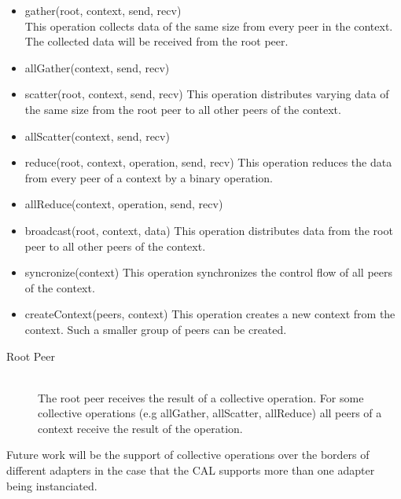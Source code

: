 \begin{itemize}
\item gather(root, context, send, recv)\\
  This operation collects data of the same size from
  every peer in the context. The collected data will be
  received from the root peer.
\item allGather(context, send, recv)
\item scatter(root, context, send, recv)
  This operation distributes varying data of the same size from the root peer to
  all other peers of the context.
\item allScatter(context, send, recv)

\item reduce(root, context, operation, send, recv)
  This operation reduces the data from every peer of a context by
  a binary operation.
\item allReduce(context, operation, send, recv)

\item broadcast(root, context, data)
  This operation distributes data from the root peer to
  all other peers of the context.
\item syncronize(context)
  This operation synchronizes the control flow of all peers of the context.
\item createContext(peers, context)
  This operation creates a new context from the context. Such a smaller
  group of peers can be created.
\end{itemize}

\begin{description}
\item[Root Peer] \hfill \\
  The root peer receives the result of a collective operation. For some
  collective operations (e.g allGather, allScatter, allReduce) all peers
  of a context receive the result of the operation.
\end{description}

Future work will be the support of collective operations over the borders
of different adapters in the case that the CAL supports more than one adapter
being instanciated.


